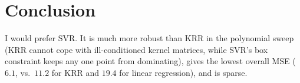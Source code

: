\documentclass[fleqn,moreauthors,10pt]{ds_report}
\begin{document}
\begin{table}[h!]
    \centering
    \caption{Best CV-tuned test MSE per method/kernel on housing2r.}
    \vspace{0.1cm}
    \label{tab:best}
    \vspace{0.1cm}
\end{table}



\section*{Conclusion}

I would prefer SVR. It is much more robust than KRR in the polynomial sweep
(KRR cannot cope with ill-conditioned kernel matrices, while SVR's box
constraint keeps any one point from dominating), gives the lowest overall MSE
($6.1$, vs.\ $11.2$ for KRR and $19.4$ for linear regression), and is sparse.
\end{document}
